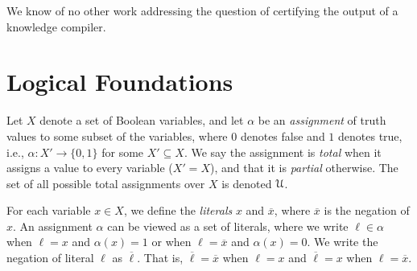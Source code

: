 \documentclass[letterpaper,USenglish,cleveref, autoref, thm-restate]{lipics-v2021}
\newcommand{\obar}[1]{\overline{#1}}
\newcommand{\lit}{\ell}
\newcommand{\varset}{X}
\newcommand{\assign}{\alpha}
\newcommand{\uassign}{{\cal U}}
\begin{document}
We know of no other
work addressing the question of certifying the output of a knowledge
compiler.

\section{Logical Foundations}
\label{section:logical:foundations}

  Let $\varset$ denote a set of Boolean variables, and let $\assign$
  be an {\em assignment} of truth values to some subset of the
  variables, where $0$ denotes false and $1$ denotes true, i.e.,
  $\assign \colon \varset' \rightarrow \{0,1\}$ for some $\varset'
  \subseteq \varset$.  We say the assignment is {\em total} when it
  assigns a value to every variable ($\varset' = \varset$), and that
  it is {\em partial} otherwise.
  The set of all possible total assignments over
  $\varset$ is denoted $\uassign$.

For each variable $x \in \varset$,
  we define the {\em literals} $x$ and $\obar{x}$, where $\obar{x}$ is the
  negation of $x$. An
  assignment $\assign$ can be viewed as a set of literals, where
  we write $\lit \in \assign$ when $\lit = x$ and $\assign(x) = 1$ or when
  $\lit = \obar{x}$ and $\assign(x) = 0$.  We write the negation of literal $\lit$ as $\obar{\lit}$.  That is, $\obar{\lit} = \obar{x}$ when $\lit = x$ and
$\obar{\lit} = x$ when $\lit = \obar{x}$.
\end{document}
